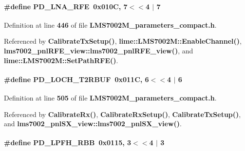 \paragraph[{P\+D\+\_\+\+L\+N\+A\+\_\+\+R\+FE}]{\setlength{\rightskip}{0pt plus 5cm}\#define P\+D\+\_\+\+L\+N\+A\+\_\+\+R\+FE~0x010\+C, 7$<$$<$4 $\vert$  7}\label{LMS7002M__parameters__compact_8h_a9267e7be269b81e76f6cdf20ecce4618}


Definition at line {\bf 446} of file {\bf L\+M\+S7002\+M\+\_\+parameters\+\_\+compact.\+h}.



Referenced by {\bf Calibrate\+Tx\+Setup()}, {\bf lime\+::\+L\+M\+S7002\+M\+::\+Enable\+Channel()}, {\bf lms7002\+\_\+pnl\+R\+F\+E\+\_\+view\+::lms7002\+\_\+pnl\+R\+F\+E\+\_\+view()}, and {\bf lime\+::\+L\+M\+S7002\+M\+::\+Set\+Path\+R\+F\+E()}.

\paragraph[{P\+D\+\_\+\+L\+O\+C\+H\+\_\+\+T2\+R\+B\+UF}]{\setlength{\rightskip}{0pt plus 5cm}\#define P\+D\+\_\+\+L\+O\+C\+H\+\_\+\+T2\+R\+B\+UF~0x011\+C, 6$<$$<$4 $\vert$  6}\label{LMS7002M__parameters__compact_8h_aa574d588a6829725b746cbff1a94b993}


Definition at line {\bf 505} of file {\bf L\+M\+S7002\+M\+\_\+parameters\+\_\+compact.\+h}.



Referenced by {\bf Calibrate\+Rx()}, {\bf Calibrate\+Rx\+Setup()}, {\bf Calibrate\+Tx\+Setup()}, and {\bf lms7002\+\_\+pnl\+S\+X\+\_\+view\+::lms7002\+\_\+pnl\+S\+X\+\_\+view()}.

\paragraph[{P\+D\+\_\+\+L\+P\+F\+H\+\_\+\+R\+BB}]{\setlength{\rightskip}{0pt plus 5cm}\#define P\+D\+\_\+\+L\+P\+F\+H\+\_\+\+R\+BB~0x0115, 3$<$$<$4 $\vert$  3}\label{LMS7002M__parameters__compact_8h_a53f2658473a0bc77a1ee0327af353339}


